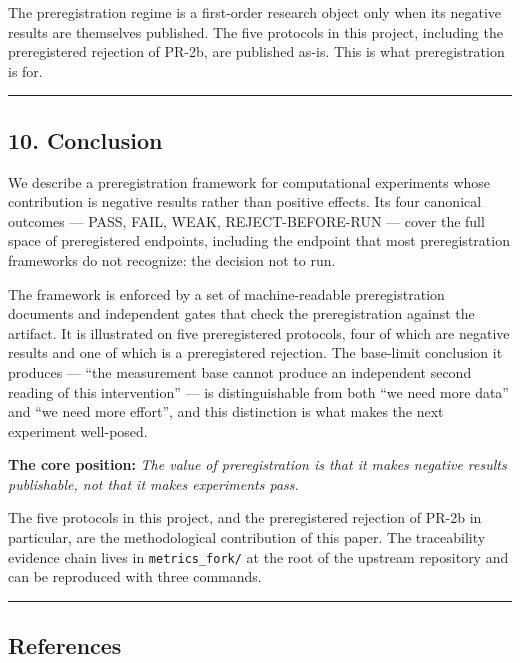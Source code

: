 \documentclass[
]{article}
\begin{document}
The preregistration regime is a first-order research object only when
its negative results are themselves published. The five protocols in
this project, including the preregistered rejection of PR-2b, are
published as-is. This is what preregistration is for.

\begin{center}\rule{0.5\linewidth}{0.5pt}\end{center}

\subsection{10. Conclusion}\label{conclusion}

We describe a preregistration framework for computational experiments
whose contribution is negative results rather than positive effects. Its
four canonical outcomes --- PASS, FAIL, WEAK, REJECT-BEFORE-RUN ---
cover the full space of preregistered endpoints, including the endpoint
that most preregistration frameworks do not recognize: the decision not
to run.

The framework is enforced by a set of machine-readable preregistration
documents and independent gates that check the preregistration against
the artifact. It is illustrated on five preregistered protocols, four of
which are negative results and one of which is a preregistered
rejection. The base-limit conclusion it produces --- ``the measurement
base cannot produce an independent second reading of this intervention''
--- is distinguishable from both ``we need more data'' and ``we need
more effort'', and this distinction is what makes the next experiment
well-posed.

\textbf{The core position:} \emph{The value of preregistration is that
it makes negative results publishable, not that it makes experiments
pass.}

The five protocols in this project, and the preregistered rejection of
PR-2b in particular, are the methodological contribution of this paper.
The traceability evidence chain lives in \texttt{metrics\_fork/} at the
root of the upstream repository and can be reproduced with three
commands.

\begin{center}\rule{0.5\linewidth}{0.5pt}\end{center}

\subsection{References}\label{references}
\end{document}

